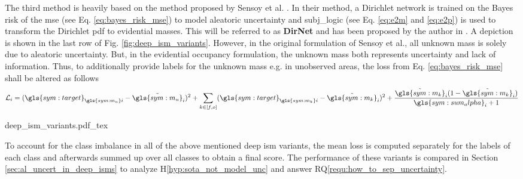 The third method is heavily based on the method proposed by Sensoy et al. \cite{sensoy2018evidential}. In their method, a Dirichlet network is trained on the Bayes risk of the \gls{mse} (see Eq. \ref{eq:bayes_risk_mse}) to model aleatoric uncertainty and \gls{subj_logic} (see Eq. \ref{eq:e2m} and \ref{eq:e2p}) is used to transform the Dirichlet \gls{pdf} to evidential masses. This will be referred to as \textbf{DirNet} and has been proposed by the author in \cite{bauer2019deepiv}. A depiction is shown in the last row of Fig. \ref{fig:deep_ism_variants}. However, in the original formulation of Sensoy et al., all unknown mass is solely due to aleatoric uncertainty. But, in the evidential occupancy formulation, the unknown mass both represents uncertainty and lack of information. Thus, to additionally provide labels for the unknown mass e.g. in unobserved areas, the loss from Eq. \ref{eq:bayes_risk_mse} shall be altered as follows
\begin{align}
	\mathcal{L}_i = (\gls{sym:target}_{\gls{sym:m_u}i}-\tilde{\gls{sym:m_u}}_i)^2 + \sum_{k\in [f,o]}(\gls{sym:target}_{\gls{sym:m_k}i}-\tilde{\gls{sym:m_k}}_i)^2 + \dfrac{\tilde{\gls{sym:m_k}}_i(1-\tilde{\gls{sym:m_k}}_i)}{\gls{sym:sum_alpha}_i+1} 
\end{align}
\begin{center}
	{deep_ism_variants.pdf_tex}
\end{center}
To account for the class imbalance in all of the above mentioned deep \gls{ism} variants, the mean loss is computed separately for the labels of each class and afterwards summed up over all classes to obtain a final score. The performance of these variants is compared in Section \ref{sec:al_uncert_in_deep_isms} to analyze H\ref{hyp:sota_not_model_unc} and answer RQ\ref{requ:how_to_sep_uncertainty}.
%
